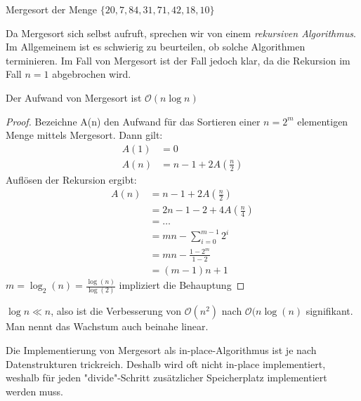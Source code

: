 \begin{example}
Mergesort der Menge $\{20,7,84,31,71,42,18,10\} $
\end{example}
\begin{remark}
Da Mergesort sich selbst aufruft, sprechen wir von einem \emph{rekursiven Algorithmus}. Im Allgemeinem ist es schwierig zu beurteilen, ob solche Algorithmen terminieren. Im Fall von Mergesort ist der Fall jedoch klar, da die Rekursion im Fall $n=1$ abgebrochen wird.
\end{remark}
\begin{theorem}
	\label{thm:mergesort}
	Der Aufwand von Mergesort ist $\mathcal{O}(n \log n)$
\end{theorem}
\begin{proof}
Bezeichne A(n) den Aufwand für das Sortieren einer $n=2^{m}$ elementigen Menge mittels Mergesort. Dann gilt:
\begin{align*}
	A(1)&=0 \\
	A(n)&=n-1 + 2A(\frac{n}{2})
\end{align*}
Auflösen der Rekursion ergibt:
\begin{align*}
	A(n)
	&=n-1+2A(\frac{n}{2})\\
	&=2n-1-2+4A(\frac{n}{4})\\
	&=\ldots \\
	&=mn-\sum_{i=0}^{m-1}2^{i} \\
	&= mn- \frac{1-2^{m}}{1-2} \\
	&= (m-1)n+1
\end{align*}
$m=\log_2(n)=\frac{\log(n)}{\log(2)}$ impliziert die Behauptung
\end{proof}
$\log n \ll n$, also ist die Verbesserung von $\mathcal{O}(n^2)$ nach $\mathcal{O}(n\log(n)$ signifikant.
Man nennt das Wachstum auch beinahe linear.

\begin{remark}
Die Implementierung von Mergesort als in-place-Algorithmus ist je nach Datenstrukturen trickreich. Deshalb wird oft nicht in-place implementiert, weshalb für jeden "divide"-Schritt zusätzlicher Speicherplatz implementiert werden muss.
\end{remark}